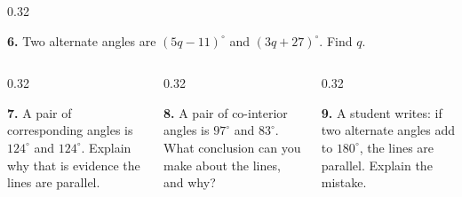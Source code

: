 \documentclass[aspectratio=169,12pt]{beamer}
\newcommand{\MMProblem}[2]{\begin{MMProblemCard}\raggedright\small\textbf{#1.} #2\par\end{MMProblemCard}}
\begin{document}
\begin{frame}[t]
\begin{columns}[T,onlytextwidth]
\begin{column}{0.32\textwidth}\MMProblem{6}{Two alternate angles are \mbox{$(5q-11)^\circ$} and \mbox{$(3q+27)^\circ$}. Find \mbox{$q$}.}\end{column}
\end{columns}
\vspace{0.45em}
\begin{columns}[T,onlytextwidth]
\begin{column}{0.32\textwidth}\MMProblem{7}{A pair of corresponding angles is \mbox{$124^\circ$} and \mbox{$124^\circ$}. Explain why that is evidence the lines are parallel.}\end{column}
\begin{column}{0.32\textwidth}\MMProblem{8}{A pair of co-interior angles is \mbox{$97^\circ$} and \mbox{$83^\circ$}. What conclusion can you make about the lines, and why?}\end{column}
\begin{column}{0.32\textwidth}\MMProblem{9}{A student writes: if two alternate angles add to \mbox{$180^\circ$}, the lines are parallel. Explain the mistake.}\end{column}
\end{columns}
\end{frame}
\end{document}
